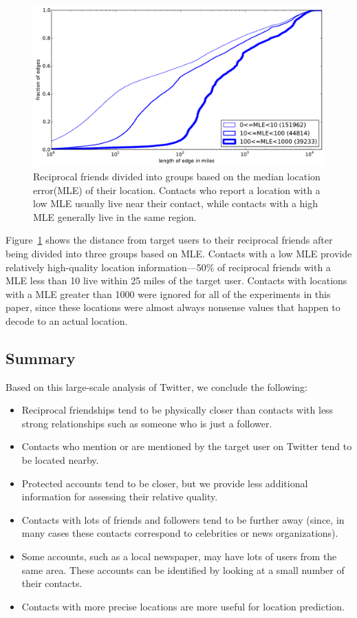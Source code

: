 \documentclass{sig-alternate}
\begin{document}
\begin{figure}[tb]
\centering
\includegraphics[width=.9\linewidth]{figures/rfrd_mdist.pdf}
\caption{
Reciprocal friends divided into groups based on the median location error(MLE)
of their location.
Contacts who report a location with a low MLE usually live near their contact,
while contacts with a high MLE generally live in the same region.
}
\label{fig:RfrdMdist}
\vspace{-2pt}
\end{figure}

Figure~\ref{fig:RfrdMdist} shows the distance from target users to their
reciprocal friends after being divided into three groups based on MLE.
%
Contacts with a low MLE provide relatively high-quality location
information---50\% of reciprocal friends with a MLE less than 10 live within 25
miles of the target user.
%
Contacts with locations with a MLE greater than 1000 were ignored for all of
the experiments in this paper, since these locations were almost always
nonsense values that happen to decode to an actual location.

\subsection{Summary}
Based on this large-scale analysis of Twitter, we conclude the following:

\begin{itemize}
\item Reciprocal friendships tend to be physically closer than contacts with
    less strong relationships such as someone who is just a follower.
\item Contacts who mention or are mentioned by the target user on Twitter tend
    to be located nearby.
\item Protected accounts tend to be closer, but we provide less additional
    information for assessing their relative quality.
\item Contacts with lots of friends and followers tend to be further away
    (since, in many cases these contacts correspond to celebrities or news
    organizations).
\item Some accounts, such as a local newspaper, may have lots of users from the same area.
    These accounts can be identified by looking at a small number of their contacts.
\item Contacts with more precise locations are more useful for location prediction.
\end{itemize}
\end{document}

